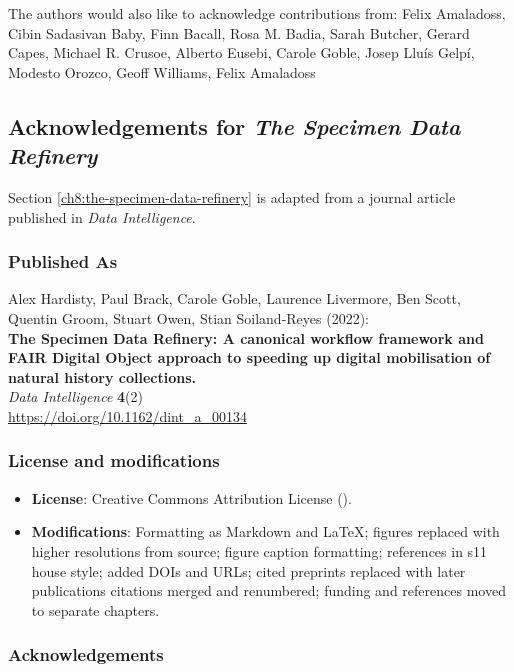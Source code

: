 The authors would also like to acknowledge contributions from: Felix
Amaladoss, Cibin Sadasivan Baby, Finn Bacall, Rosa M. Badia, Sarah
Butcher, Gerard Capes, Michael R. Crusoe, Alberto Eusebi, Carole Goble,
Josep Lluís Gelpí, Modesto Orozco, Geoff Williams, Felix Amaladoss


\subsection{Acknowledgements for \emph{The Specimen Data Refinery}}\label{ch11:refinery}

Section \vref{ch8:the-specimen-data-refinery} is adapted from a journal article published in \emph{Data Intelligence}.

\subsubsection*{Published As}

Alex Hardisty, Paul Brack, Carole Goble, Laurence Livermore, Ben Scott,
Quentin Groom, Stuart Owen, Stian Soiland-Reyes (2022):\\
\textbf{The Specimen Data Refinery: A canonical workflow framework and
FAIR Digital Object approach to speeding up digital mobilisation of
natural history collections.}\\
\emph{Data Intelligence} \textbf{4}(2)\\
\url{https://doi.org/10.1162/dint_a_00134}

\subsubsection*{License and modifications}

\begin{itemize}
\tightlist
\item
  \textbf{License}: Creative Commons Attribution License
  ().
\item
  \textbf{Modifications}: Formatting as Markdown and LaTeX; figures replaced with higher resolutions from source; figure caption formatting; references in s11 house style; added DOIs and URLs; cited preprints replaced with later publications
  citations merged and renumbered; funding and references moved to separate chapters.
\end{itemize}


\subsubsection*{Acknowledgements}

